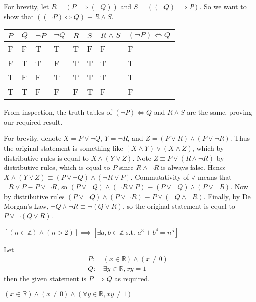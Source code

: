 \begin{questions}
    \item For brevity, let $R = (P \implies (\lnot Q))$ and $S = ((\lnot Q) \implies P)$. So we want to show that $((\lnot P) \iff Q) \equiv R \land S$.
    \begin{table}[h]
        \centering
        \begin{tabular}{|l|l||l|l|l|l||l|l|}
            \hline
            $P$ & $Q$ & $\lnot P$ & $\lnot Q$ & $R$ & $S$ & $R \land S$ & $(\lnot P) \iff Q$ \\ \hline
            F   & F   & T         & T         & T   & F   & F           & F                  \\ \hline
            F   & T   & T         & F         & T   & T   & T           & T                  \\ \hline
            T   & F   & F         & T         & T   & T   & T           & T                  \\ \hline
            T   & T   & F         & F         & F   & T   & F           & F                  \\ \hline
        \end{tabular}
    \end{table}

    From inspection, the truth tables of $(\lnot P) \iff Q$ and $R \land S$ are the same, proving our required result.
    
    \item For brevity, denote $X = P \lor \lnot Q$, $Y = \lnot R$, and $Z = (P \lor R) \land (P \lor \lnot R)$. Thus the original statement is something like $(X \land Y) \lor (X \land Z)$, which by distributive rules is equal to $X \land (Y \lor Z)$. Note $Z \equiv P \lor (R \land \lnot R)$ by distributive rules, which is equal to $P$ since $R \land \lnot R$ is always false. Hence $X \land (Y \lor Z) \equiv (P \lor \lnot Q) \land (\lnot R \lor P)$. Commutativity of $\lor$ means that $\lnot R \lor P \equiv P \lor \lnot R$, so $(P \lor \lnot Q) \land (\lnot R \lor P) \equiv (P \lor \lnot Q) \land (P \lor \lnot R)$. Now by distributive rules $(P \lor \lnot Q) \land (P \lor \lnot R) \equiv P \lor (\lnot Q \land \lnot R)$. Finally, by De Morgan's Law, $\lnot Q \land \lnot R \equiv \lnot(Q \lor R)$, so the original statement is equal to $P \lor \lnot(Q \lor R)$.
    
    \item $\left[(n \in \mathbb{Z}) \land (n > 2)\right] \implies \left[\exists a, b \in \mathbb{Z} \text{ s.t. } a^3 + b^4 = n^5\right]$
    
    \item \begin{partquestions}{\roman*}
        \item Let
        \begin{align*}
            P:&\ (x \in \mathbb{R}) \land (x \neq 0)\\
            Q:&\ \exists y \in \mathbb{R}, xy = 1
        \end{align*}
        then the given statement is $P \implies Q$ as required.
        \item $(x \in \mathbb{R}) \land (x \neq 0) \land (\forall y \in \mathbb{R}, xy \neq 1)$
    \end{partquestions}
    

\end{questions}
